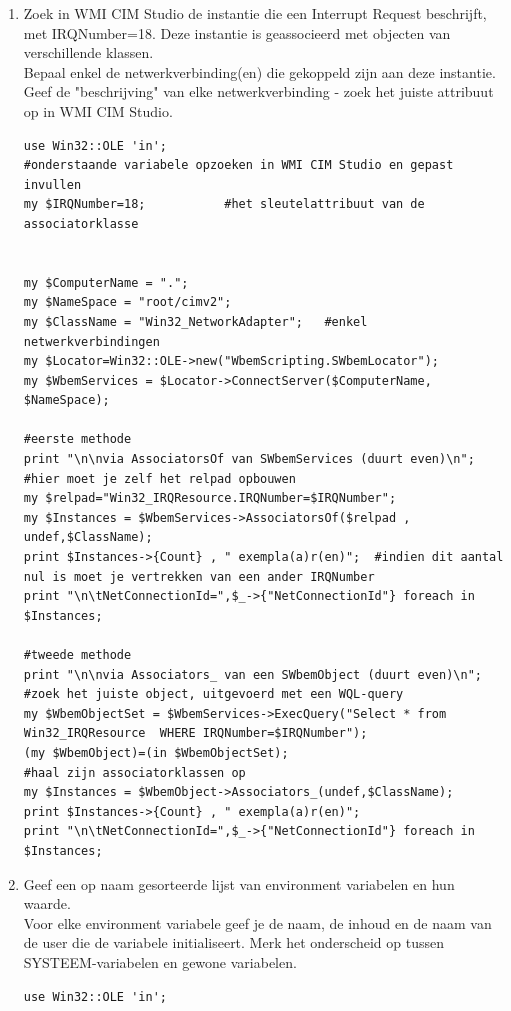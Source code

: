 \documentclass[11pt,a4paper]{report}
\begin{document}
\begin{enumerate}[resume]
\begin{lstlisting}
my $Associators = $Instance->Associators_(undef,undef,undef,undef,1); #enkel de klassen voor de geassocieerde objecten
print $Associators->{Count} , " exempla(a)r(en) \n";
	\end{lstlisting}
	\item Zoek in WMI CIM Studio de instantie die een Interrupt Request beschrijft, met IRQNumber=18. Deze instantie is geassocieerd met objecten van verschillende klassen.
	\\Bepaal enkel de netwerkverbinding(en) die gekoppeld zijn aan deze instantie. Geef de "beschrijving" van elke netwerkverbinding - zoek het juiste attribuut op in WMI CIM Studio.
	\begin{lstlisting}
use Win32::OLE 'in';
#onderstaande variabele opzoeken in WMI CIM Studio en gepast invullen
my $IRQNumber=18;           #het sleutelattribuut van de associatorklasse


my $ComputerName = ".";
my $NameSpace = "root/cimv2";
my $ClassName = "Win32_NetworkAdapter";   #enkel netwerkverbindingen
my $Locator=Win32::OLE->new("WbemScripting.SWbemLocator");
my $WbemServices = $Locator->ConnectServer($ComputerName, $NameSpace);

#eerste methode
print "\n\nvia AssociatorsOf van SWbemServices (duurt even)\n";
#hier moet je zelf het relpad opbouwen
my $relpad="Win32_IRQResource.IRQNumber=$IRQNumber";
my $Instances = $WbemServices->AssociatorsOf($relpad , undef,$ClassName);
print $Instances->{Count} , " exempla(a)r(en)";  #indien dit aantal nul is moet je vertrekken van een ander IRQNumber
print "\n\tNetConnectionId=",$_->{"NetConnectionId"} foreach in $Instances;

#tweede methode 
print "\n\nvia Associators_ van een SWbemObject (duurt even)\n";
#zoek het juiste object, uitgevoerd met een WQL-query
my $WbemObjectSet = $WbemServices->ExecQuery("Select * from Win32_IRQResource  WHERE IRQNumber=$IRQNumber");
(my $WbemObject)=(in $WbemObjectSet);
#haal zijn associatorklassen op
my $Instances = $WbemObject->Associators_(undef,$ClassName);
print $Instances->{Count} , " exempla(a)r(en)";
print "\n\tNetConnectionId=",$_->{"NetConnectionId"} foreach in $Instances;
	\end{lstlisting}
	\item Geef een op naam gesorteerde lijst van environment variabelen en hun waarde.
	\\Voor elke environment variabele geef je de naam, de inhoud en de naam van de user die de variabele initialiseert. Merk het onderscheid op tussen SYSTEEM-variabelen en gewone variabelen.
	\begin{lstlisting}
use Win32::OLE 'in';


\end{lstlisting}
\end{enumerate}
\end{document}
